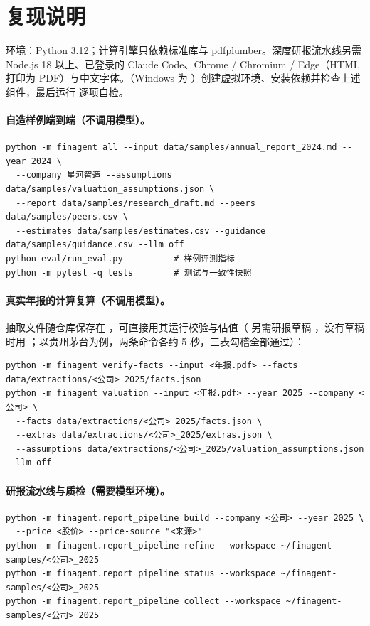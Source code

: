 \section{复现说明}
\label{app:repro}

环境：Python 3.12；计算引擎只依赖标准库与 pdfplumber。深度研报流水线另需 Node.js 18 以上、已登录的 Claude Code、Chrome / Chromium / Edge（HTML 打印为 PDF）与中文字体。（Windows 为 ）创建虚拟环境、安装依赖并检查上述组件，最后运行  逐项自检。

\paragraph{自造样例端到端（不调用模型）。}
\begin{verbatim}
python -m finagent all --input data/samples/annual_report_2024.md --year 2024 \
  --company 星河智造 --assumptions data/samples/valuation_assumptions.json \
  --report data/samples/research_draft.md --peers data/samples/peers.csv \
  --estimates data/samples/estimates.csv --guidance data/samples/guidance.csv --llm off
python eval/run_eval.py          # 样例评测指标
python -m pytest -q tests        # 测试与一致性快照
\end{verbatim}

\paragraph{真实年报的计算复算（不调用模型）。}抽取文件随仓库保存在 ，可直接用其运行校验与估值（ 另需研报草稿 ，没有草稿时用 ；以贵州茅台为例，两条命令各约 5 秒，三表勾稽全部通过）：
\begin{verbatim}
python -m finagent verify-facts --input <年报.pdf> --facts data/extractions/<公司>_2025/facts.json
python -m finagent valuation --input <年报.pdf> --year 2025 --company <公司> \
  --facts data/extractions/<公司>_2025/facts.json \
  --extras data/extractions/<公司>_2025/extras.json \
  --assumptions data/extractions/<公司>_2025/valuation_assumptions.json --llm off
\end{verbatim}

\paragraph{研报流水线与质检（需要模型环境）。}
\begin{verbatim}
python -m finagent.report_pipeline build --company <公司> --year 2025 \
  --price <股价> --price-source "<来源>"
python -m finagent.report_pipeline refine --workspace ~/finagent-samples/<公司>_2025
python -m finagent.report_pipeline status --workspace ~/finagent-samples/<公司>_2025
python -m finagent.report_pipeline collect --workspace ~/finagent-samples/<公司>_2025
\end{verbatim}

